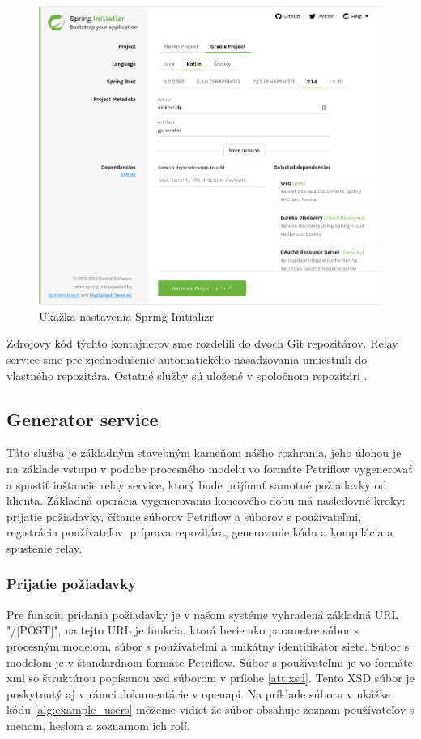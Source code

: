  \begin{figure}[!htbp]
	\centering
	\includegraphics[width=16cm]{img/initializr.png}
	\caption{Ukážka nastavenia Spring Initializr}
	\label{initializr}
\end{figure}

Zdrojovy kód týchto kontajnerov sme rozdelili do dvoch Git repozitárov. Relay service sme pre zjednodušenie automatického nasadzovania umiestnili do vlastného repozitára\cite{dp_relay}. Ostatné služby sú uložené v spoločnom repozitári \cite{dp_repo}. 



\subsection{Generator service}
Táto služba je základným stavebným kameňom nášho rozhrania, jeho úlohou je na základe vstupu v podobe procesného modelu vo formáte Petriflow vygenerovať a spustiť inštancie relay service, ktorý bude prijímať samotné požiadavky od klienta. Základná operácia vygenerovania koncového dobu má nasledovné kroky:
prijatie požiadavky,
čítanie súborov Petriflow a súborov s používateľmi,
registrácia používateľov,
príprava repozitára,
generovanie kódu
a kompilácia a spustenie relay.

\subsubsection{Prijatie požiadavky}
Pre funkciu pridania požiadavky je v našom systéme vyhradená základná URL "/[POST]", na tejto URL je funkcia, ktorá berie ako parametre súbor s procesným modelom, súbor s používateľmi a unikátny identifikátor siete. Súbor s modelom je v štandardnom formáte Petriflow. Súbor s používateľmi je vo formáte \acrshort{xml} so štruktúrou popísanou \acrshort{xsd} súborom v prílohe \ref{att:xsd}. Tento XSD súbor je poskytnutý aj v rámci dokumentácie v \acrshort{openapi}. Na príklade súboru v ukážke kódu \ref{alg:example_users} môžeme vidieť že súbor obsahuje zoznam používateľov s menom, heslom a zoznamom ich rolí.

